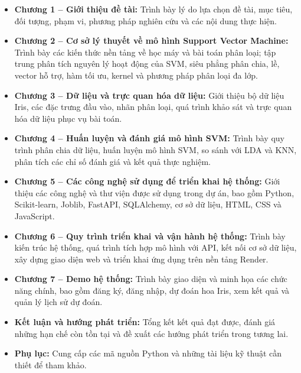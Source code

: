 \documentclass[14pt]{extarticle}
\begin{document}
\begin{itemize}
	
	\item \textbf{Chương 1 -- Giới thiệu đề tài:}
	Trình bày lý do lựa chọn đề tài, mục tiêu, đối tượng, phạm vi, phương pháp nghiên cứu và các nội dung thực hiện.
	
	\item \textbf{Chương 2 -- Cơ sở lý thuyết về mô hình Support Vector Machine:}
	Trình bày các kiến thức nền tảng về học máy và bài toán phân loại; tập trung phân tích nguyên lý hoạt động của SVM, siêu phẳng phân chia, lề, vector hỗ trợ, hàm tối ưu, kernel và phương pháp phân loại đa lớp.
	
	\item \textbf{Chương 3 -- Dữ liệu và trực quan hóa dữ liệu:}
	Giới thiệu bộ dữ liệu Iris, các đặc trưng đầu vào, nhãn phân loại, quá trình khảo sát và trực quan hóa dữ liệu phục vụ bài toán.
	
	\item \textbf{Chương 4 -- Huấn luyện và đánh giá mô hình SVM:}
	Trình bày quy trình phân chia dữ liệu, huấn luyện mô hình SVM, so sánh với LDA và KNN, phân tích các chỉ số đánh giá và kết quả thực nghiệm.
	
	\item \textbf{Chương 5 -- Các công nghệ sử dụng để triển khai hệ thống:}
	Giới thiệu các công nghệ và thư viện được sử dụng trong dự án, bao gồm Python, Scikit-learn, Joblib, FastAPI, SQLAlchemy, cơ sở dữ liệu, HTML, CSS và JavaScript.
	
	\item \textbf{Chương 6 -- Quy trình triển khai và vận hành hệ thống:}
	Trình bày kiến trúc hệ thống, quá trình tích hợp mô hình với API, kết nối cơ sở dữ liệu, xây dựng giao diện web và triển khai ứng dụng trên nền tảng Render.
	
	\item \textbf{Chương 7 -- Demo hệ thống:}
	Trình bày giao diện và minh họa các chức năng chính, bao gồm đăng ký, đăng nhập, dự đoán hoa Iris, xem kết quả và quản lý lịch sử dự đoán.
	
	\item \textbf{Kết luận và hướng phát triển:}
	Tổng kết kết quả đạt được, đánh giá những hạn chế còn tồn tại và đề xuất các hướng phát triển trong tương lai.
	
	\item \textbf{Phụ lục:}
	Cung cấp các mã nguồn Python và những tài liệu kỹ thuật cần thiết để tham khảo.
	
\end{itemize}
\end{document}

